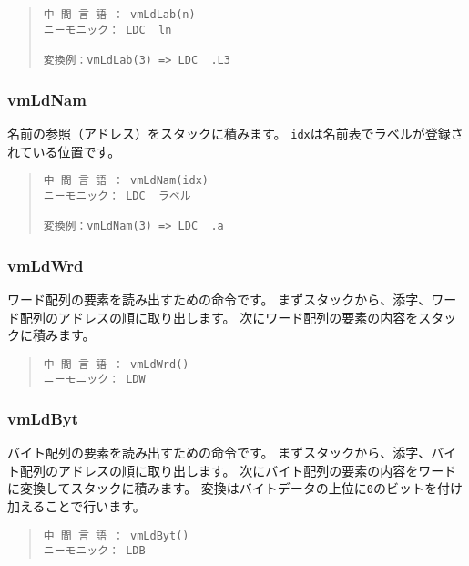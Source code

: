 \begin{quote}
\begin{verbatim}
中 間 言 語 ： vmLdLab(n)
ニーモニック： LDC  ln   

変換例：vmLdLab(3) => LDC  .L3
\end{verbatim}
\end{quote}

\subsubsection{vmLdNam}

名前の参照（アドレス）をスタックに積みます。
\verb/idx/は名前表でラベルが登録されている位置です。

\begin{quote}
\begin{verbatim}
中 間 言 語 ： vmLdNam(idx)
ニーモニック： LDC  ラベル

変換例：vmLdNam(3) => LDC  .a
\end{verbatim}
\end{quote}

\subsubsection{vmLdWrd}

ワード配列の要素を読み出すための命令です。
まずスタックから、添字、ワード配列のアドレスの順に取り出します。
次にワード配列の要素の内容をスタックに積みます。

\begin{quote}
\begin{verbatim}
中 間 言 語 ： vmLdWrd()
ニーモニック： LDW
\end{verbatim}
\end{quote}

\subsubsection{vmLdByt}

バイト配列の要素を読み出すための命令です。
まずスタックから、添字、バイト配列のアドレスの順に取り出します。
次にバイト配列の要素の内容をワードに変換してスタックに積みます。
変換はバイトデータの上位に\verb/0/のビットを付け加えることで行います。

\begin{quote}
\begin{verbatim}
中 間 言 語 ： vmLdByt()
ニーモニック： LDB
\end{verbatim}
\end{quote}

